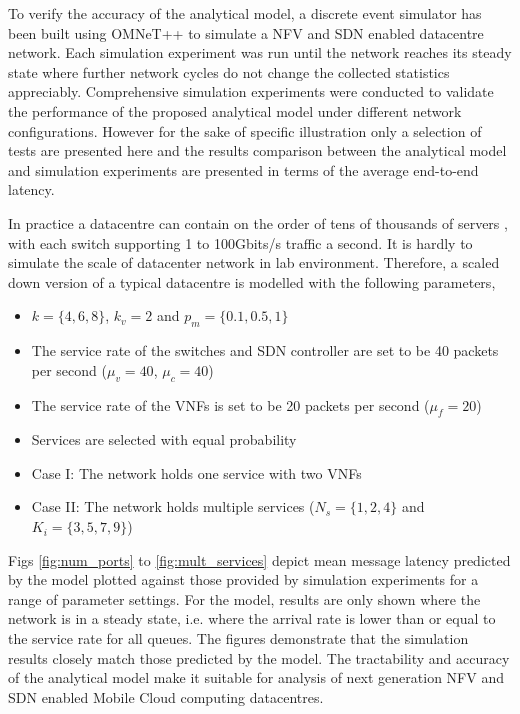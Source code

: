 To verify the accuracy of the analytical model, a discrete event simulator has been built using OMNeT++ \cite{VargaH08} to simulate a NFV and SDN enabled datacentre network. Each simulation experiment was run until the network reaches its steady state where further network cycles do not change the collected statistics appreciably. Comprehensive simulation experiments were conducted to validate the performance of the proposed analytical model under different network configurations. However for the sake of specific illustration only a selection of tests are presented here and the results comparison between the analytical model and simulation experiments are presented in terms of the average end-to-end latency.

In practice a datacentre can contain on the order of tens of thousands of servers \cite{AWS16}, with each switch supporting 1 to 100Gbits/s traffic a second. It is hardly to simulate the scale of datacenter network in lab environment. Therefore, a scaled down version of a typical datacentre is modelled with the following parameters, 

\begin{itemize}
\item $k = \{4, 6, 8\}$, $k_{v} = 2$ and $p_{m} = \{0.1, 0.5, 1\}$
\item The service rate of the switches and SDN controller are set to be 40 packets per second ($\mu_{v} = 40$, $\mu_{c} = 40$)
\item The service rate of the VNFs is set to be 20 packets per second ($\mu_{f} = 20$)
\item Services are selected with equal probability
\item Case I: The network holds one service with two VNFs
\item Case II: The network holds multiple services ($N_s = \{1,2,4\}$ and $K_i=\{3,5,7,9\}$)
\end{itemize}

Figs \ref{fig:num_ports} to \ref{fig:mult_services} depict mean message latency predicted by the model plotted against those provided by simulation experiments for a range of parameter settings. For the model, results are only shown where the network is in a steady state, i.e. where the arrival rate is lower than or equal to the service rate for all queues. The figures demonstrate that the simulation results closely match those predicted by the model. The tractability and accuracy of the analytical model make it suitable for analysis of next generation NFV and SDN enabled Mobile Cloud computing datacentres.